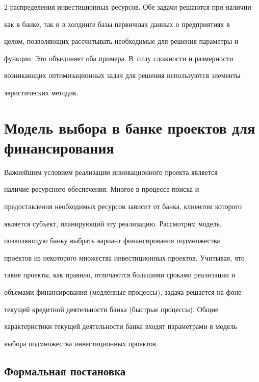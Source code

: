 \begin{multicols}{2}
распределения инвестиционных ресурсов. Обе задачи решаются при наличии 


как в банке, так и в холдинге базы первичных данных о предприятиях в 


целом, позволяющих рассчитывать необходимые для решения параметры и 


функции. Это объединяет оба примера. В~силу сложности и размерности 


возникающих оптимизационных задач для решения используются элементы 


эвристических методик.





\section{Модель выбора в банке проектов для финансирования}


     


     Важнейшим условием реализации инновационного проекта является 


наличие ресурсного обеспечения. Многое в процессе поиска и 


предоставления необходимых ресурсов зависит от банка, клиентом которого 


является субъект, планирующий эту реализацию. Рассмотрим модель, 


позволяющую банку выбрать вариант финансирования подмножества 


проектов из некоторого множества ин\-вес\-ти\-ци\-он\-ных проектов. Учитывая, что 


такие проекты, как правило, отличаются большими сроками реализации и 


объемами финансирования (медленные процессы), задача решается на фоне 


текущей кредитной деятельности банка (быстрые процессы). Общие 


характеристики текущей деятельности банка входят параметрами в модель 


выбора подмножества инвестиционных проектов.





\subsection{Формальная постановка} %



\end{multicols}
